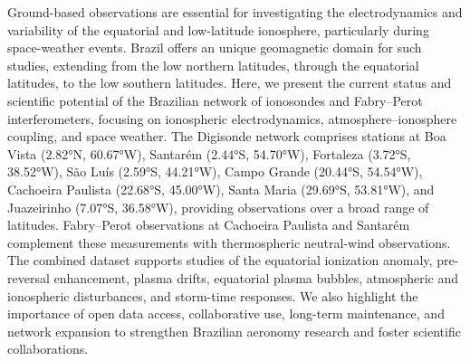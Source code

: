 \documentclass[11pt,a4paper]{article}
\newenvironment{EntryAbstract}[1][\normalsize]
  {\begingroup #1 \setlength{\parskip}{0.55em}\sloppy\noindent\ignorespaces}
  {\par\endgroup}
\begin{document}
\begin{EntryAbstract}[\normalsize]
Ground-based observations are essential for investigating the electrodynamics and variability of the equatorial and low-latitude ionosphere, particularly during space-weather events. Brazil offers an unique geomagnetic domain for such studies, extending from the low northern latitudes, through the equatorial latitudes, to the low southern latitudes. Here, we present the current status and scientific potential of the Brazilian network of ionosondes and Fabry–Perot interferometers, focusing on ionospheric electrodynamics, atmosphere–ionosphere coupling, and space weather. The Digisonde network comprises stations at Boa Vista (2.82°N, 60.67°W), Santarém (2.44°S, 54.70°W), Fortaleza (3.72°S, 38.52°W), São Luís (2.59°S, 44.21°W), Campo Grande (20.44°S, 54.54°W), Cachoeira Paulista (22.68°S, 45.00°W), Santa Maria (29.69°S, 53.81°W), and Juazeirinho (7.07°S, 36.58°W), providing observations over a broad range of latitudes. Fabry–Perot observations at Cachoeira Paulista and Santarém complement these measurements with thermospheric neutral-wind observations. The combined dataset supports studies of the equatorial ionization anomaly, pre-reversal enhancement, plasma drifts, equatorial plasma bubbles, atmospheric and ionospheric disturbances, and storm-time responses. We also highlight the importance of open data access, collaborative use, long-term maintenance, and network expansion to strengthen Brazilian aeronomy research and foster scientific collaborations.
\end{EntryAbstract}
\end{document}

